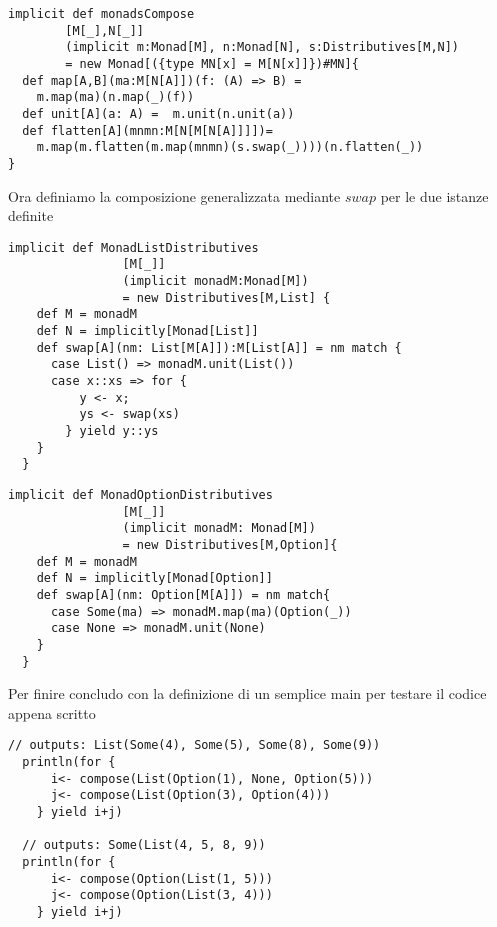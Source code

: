 \begin{lstlisting}[style=myScalastyle, caption=SComposable is Monad]
implicit def monadsCompose
        [M[_],N[_]]
        (implicit m:Monad[M], n:Monad[N], s:Distributives[M,N])
        = new Monad[({type MN[x] = M[N[x]]})#MN]{
  def map[A,B](ma:M[N[A]])(f: (A) => B) =
    m.map(ma)(n.map(_)(f))
  def unit[A](a: A) =  m.unit(n.unit(a))
  def flatten[A](mnmn:M[N[M[N[A]]]])=
    m.map(m.flatten(m.map(mnmn)(s.swap(_))))(n.flatten(_))
}
\end{lstlisting}

Ora definiamo la composizione generalizzata mediante $swap$ per le due istanze
definite
\begin{lstlisting}[style=myScalastyle, caption=Composing List]
  implicit def MonadListDistributives
                [M[_]]
                (implicit monadM:Monad[M])
                = new Distributives[M,List] {
    def M = monadM
    def N = implicitly[Monad[List]]
    def swap[A](nm: List[M[A]]):M[List[A]] = nm match {
      case List() => monadM.unit(List())
      case x::xs => for {
          y <- x;
          ys <- swap(xs)
        } yield y::ys
    }
  }
\end{lstlisting}
\pagebreak
\begin{lstlisting}[style=myScalastyle, caption=Composing Optional]
  implicit def MonadOptionDistributives
                [M[_]]
                (implicit monadM: Monad[M])
                = new Distributives[M,Option]{
    def M = monadM
    def N = implicitly[Monad[Option]]
    def swap[A](nm: Option[M[A]]) = nm match{
      case Some(ma) => monadM.map(ma)(Option(_))
      case None => monadM.unit(None)
    }
  }
\end{lstlisting}

Per finire concludo con la definizione di un semplice main per testare il codice
appena scritto
\begin{lstlisting}[style=myScalastyle, caption=Main]
  // outputs: List(Some(4), Some(5), Some(8), Some(9))
  println(for {
      i<- compose(List(Option(1), None, Option(5)))
      j<- compose(List(Option(3), Option(4)))
    } yield i+j)

  // outputs: Some(List(4, 5, 8, 9))
  println(for {
      i<- compose(Option(List(1, 5)))
      j<- compose(Option(List(3, 4)))
    } yield i+j)
\end{lstlisting}
